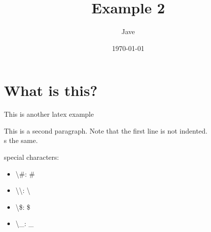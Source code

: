 \documentclass[letterpaper, 12pt]{article}
\begin{document}
\date{\today}
\title{Example 2}
\author{Jave}
\maketitle
\section{What is this?}
This is another latex example

This is a second paragraph. Note that the first line is not indented.\\ %
s the same.

\noindent special characters:
\begin{itemize}
    \item \textbackslash{}\#: \#           
    \item \textbackslash{}\textbackslash: \textbackslash 
    \item \textbackslash{}\$: \$            
    \item \textbackslash{}\_: \_
\end{itemize}
\end{document}
